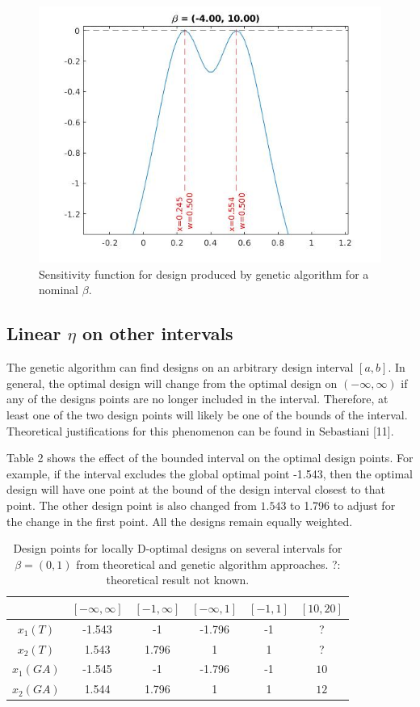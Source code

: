 \documentclass[11pt,a4paper]{article}
\begin{document}
\begin{figure}
\centering
\includegraphics[scale=0.5]{figures/fig1.jpg}
\caption{Sensitivity function for design produced by genetic algorithm for a nominal $\beta$.}
\end{figure}

\subsection{Linear $\eta$ on other intervals}
The genetic algorithm can find designs on an arbitrary design interval $[a,b]$. In general, the optimal design will change from the optimal design on $(-\infty, \infty)$ if any of the designs points are no longer included in the interval. Therefore, at least one of the two design points will likely be one of the bounds of the interval. Theoretical justifications for this phenomenon can be found in Sebastiani [11]. 

Table 2 shows the effect of the bounded interval on the optimal design points. For example, if the interval excludes the global optimal point -1.543, then the optimal design will have one point at the bound of the design interval closest to that point. The other design point is also changed from $1.543$ to 1.796 to adjust for the change in the first point. All the designs remain equally weighted.

\begin{table}
\centering
\begin{tabular}{|c|c|c|c|c|c|}
\hline 
  & $[-\infty, \infty]$  & $[-1, \infty]$ & $[-\infty,1]$ & $[-1,1]$ & $[10, 20]$\\ 
\hline 
$x_1 (T)$ & -1.543 & -1 & -1.796 & -1  & ?\\ 
\hline 
$x_2 (T)$ & 1.543 & 1.796 & 1 & 1 & ?\\ 

\hline
$x_1 (GA)$ & -1.545 & -1 & -1.796 & -1 & $10$\\
\hline
$x_2 (GA)$ & 1.544 & 1.796 & 1 & 1 & $12$\\
\hline
\end{tabular}
\caption{Design points for locally D-optimal designs on several intervals for $\beta = (0,1)$ from theoretical and genetic algorithm approaches. ?: theoretical result not known.}
\end{table}
\end{document}
